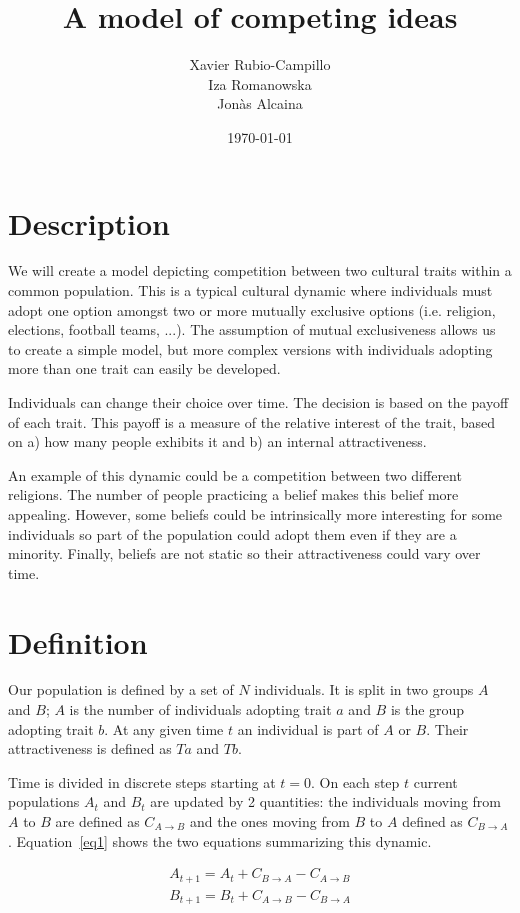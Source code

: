 \documentclass[12pt]{article}
\title{A model of competing ideas}
\author{Xavier Rubio-Campillo \\ Iza Romanowska \\ Jonàs Alcaina}
\date{\today}
\begin{document}
\maketitle


\section{Description}

We will create a model depicting competition between two cultural traits within a common population. This is a typical cultural dynamic where individuals must adopt one option amongst two or more mutually exclusive options (i.e. religion, elections, football teams, ...). The assumption of mutual exclusiveness allows us to create a simple model, but more complex versions with individuals adopting more than one trait can easily be developed.

Individuals can change their choice over time. The decision is based on the payoff of each trait. This payoff is a measure of the relative interest of the trait, based on a) how many people exhibits it and b) an internal attractiveness.

An example of this dynamic could be a competition between two different religions. The number of people practicing a belief makes this belief more appealing. However, some beliefs could be intrinsically more interesting for some individuals so part of the population could adopt them even if they are a minority. Finally, beliefs are not static so their attractiveness could vary over time.

\section{Definition}

Our population is defined by a set of $N$ individuals. It is split in two groups $A$ and $B$; $A$ is the number of individuals adopting trait $a$ and $B$ is the group adopting trait $b$. At any given time $t$ an individual is part of $A$ or $B$. Their attractiveness is defined as $Ta$ and $Tb$.

Time is divided in discrete steps starting at $t=0$. On each step $t$ current populations $A_t$ and $B_t$ are updated by 2 quantities: the individuals moving from $A$ to $B$ are defined as $C_{A \to B}$ and the ones moving from $B$ to $A$ defined as $C_{B \to A}$. Equation~\ref{eq1} shows the two equations summarizing this dynamic.

\begin{equation}
\begin{split}
A_{t+1} = A_t + C_{B \to A} - C_{A \to B} \\
B_{t+1} = B_t + C_{A \to B} - C_{B \to A}
\end{split}
\label{eq1}
\end{equation}
\end{document}
